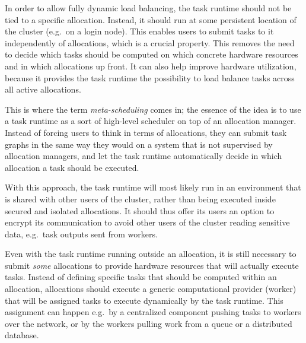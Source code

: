 \begin{description}[wide=0pt]
	\item[Task runtime runs outside of allocations] In order to allow fully dynamic load balancing, the task runtime should not be tied to a specific
		allocation. Instead, it should run at some persistent location of the cluster (e.g.\ on a login
		node). This enables users to submit tasks to it independently of allocations, which is a crucial
		property. This removes the need to decide which tasks should be computed on which concrete hardware
		resources and in which allocations up front. It can also help improve hardware utilization, because
		it provides the task runtime the possibility to load balance tasks across all active allocations.

		This is where the term \emph{meta-scheduling} comes in; the essence of the idea is to use a task
		runtime as a sort of high-level scheduler on top of an allocation manager. Instead of forcing users
		to think in terms of allocations, they can submit task graphs in the same way they would on a
		system that is not supervised by allocation managers, and let the task runtime automatically decide
		in which allocation a task should be executed.

		With this approach, the task runtime will most likely run in an environment that is shared with
		other users of the cluster, rather than being executed inside secured and isolated allocations. It
		should thus offer its users an option to encrypt its communication to avoid other users of the
		cluster reading sensitive data, e.g.\ task outputs sent from workers.
	\item[Allocations are uniform] Even with the task runtime running outside an allocation, it is still necessary to submit
		\emph{some} allocations to provide hardware resources that will actually execute tasks.
		Instead of defining specific tasks that should be computed within an allocation, allocations should
		execute a generic computational provider (worker) that will be assigned tasks to execute
		dynamically by the task runtime. This assignment can happen e.g.\ by a centralized component
		pushing tasks to workers over the network, or by the workers pulling work from a queue or a
		distributed database.


\end{description}
